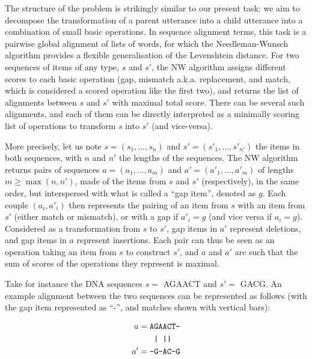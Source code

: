 \documentclass[a4paper,fleqn]{cas-dc}
\begin{document}
The structure of the problem is strikingly similar to our present task:
we aim to decompose the transformation of a parent utterance into a
child utterance into a combination of small basic operations. In
sequence alignment terms, this task is a pairwise global alignment of
lists of words, for which the Needleman-Wunsch algorithm
\citep[henceforth NW]{needleman_general_1970} provides a flexible
generalisation of the Levenshtein distance. For two sequences of items
of any type, \(s\) and \(s'\), the NW algorithm assigns different scores
to each basic operation (gap, mismatch a.k.a. replacement, and match,
which is considered a scored operation like the first two), and returns
the list of alignments between \(s\) and \(s'\) with maximal total
score. There can be several such alignments, and each of them can be
directly interpreted as a minimally scoring list of operations to
transform \(s\) into \(s'\) (and vice-versa).

More precisely, let us note \(s = (s_1, ..., s_n)\) and
\(s' = (s'_1, ..., s'_{n'})\) the items in both sequences, with \(n\)
and \(n'\) the lengths of the sequences. The NW algorithm returns pairs
of sequences \(a = (a_1, ..., a_m)\) and \(a' = (a'_1, ..., a'_m)\) of lengths \(m \geq \max(n, n')\), made of
the items from \(s\) and \(s'\) (respectively), in the same order, but
interspersed with what is called a \enquote{gap item}, denoted as \(g\).
Each couple \((a_i, a'_i)\) then represents
the pairing of an item from \(s\) with an item from \(s'\) (either match
or mismatch), or with a gap if \(a'_i = g\) (and vice versa if
\(a_i = g\)). Considered as a transformation from \(s\) to \(s'\), gap
items in \(a'\) represent deletions, and gap items in \(a\) represent
insertions. Each pair can thus be seen as an operation taking an item
from \(s\) to construct \(s'\), and \(a\) and \(a'\) are such that the
sum of scores of the operations they represent is maximal.

Take for instance the DNA sequences \(s =\) AGAACT and \(s' =\) GACG. An
example alignment between the two sequences can be represented as
follows (with the gap item represented as \enquote{-}, and matches shown
with vertical bars):

\begin{align*}
  a  = {} & \text{\texttt{AGAACT-}} \\
       {} & \text{\texttt{  | ||}} \\
  a' = {} & \text{\texttt{-G-AC-G}}
\end{align*}
\end{document}
